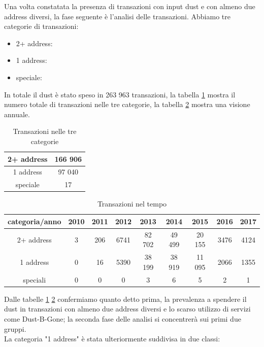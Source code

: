 Una volta constatata la presenza di transazioni con input dust e con almeno due address diversi, la fase seguente è l'analisi delle transazioni. Abbiamo tre categorie di transazioni: 
\begin{itemize}
    \item 2+ address:
    \item 1 address:
    \item speciale:
\end{itemize}

In totale il dust è stato speso in 263 963 transazioni, la tabella \ref{tab:tx_categories} mostra il numero totale di transazioni nelle tre categorie, la tabella \ref{tab:tx_categories_year} mostra una visione annuale.
\begin{table}[H]
    \centering
    \begin{tabular}{|c|c|}
        \hline
        2+ address & 166 906\\
        \hline
        1 address & 97 040\\
        \hline
        speciale & 17\\
        \hline
    \end{tabular}
    \caption{Transazioni nelle tre categorie}
    \label{tab:tx_categories}
\end{table}
\begin{table}[H]
    \centering
    \begin{tabular}{|c|c|c|c|c|c|c|c|c|}
        \hline
            categoria/anno  & 2010 & 2011 & 2012 & 2013 & 2014 & 2015 & 2016 & 2017\\
        \hline 
         2+ address &  3 & 206 & 6741 & 82 702 & 49 499 & 20 155 & 3476 & 4124 \\
         \hline
         1 address & 0 & 16 & 5390 & 38 199 & 38 919 & 11 095 & 2066 & 1355  \\
         \hline
         speciali & 0 & 0 & 0 & 3 & 6 & 5 & 2 & 1 \\
         \hline
    \end{tabular}
    \caption{Transazioni nel tempo}
    \label{tab:tx_categories_year}
\end{table}
Dalle tabelle \ref{tab:tx_categories} \ref{tab:tx_categories_year} confermiamo quanto detto prima, la prevalenza a spendere il dust in transazioni con almeno due address diversi e lo scarso utilizzo di servizi come Dust-B-Gone; la seconda fase delle analisi si concentrerà sui primi due gruppi.\\
La categoria "1 address" è stata ulteriormente suddivisa in due classi:
